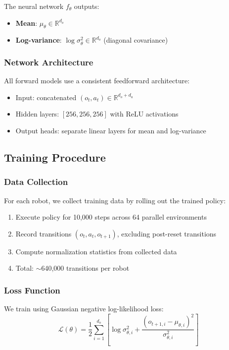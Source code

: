 \documentclass[11pt,a4paper]{article}
\begin{document}
The neural network $f_\theta$ outputs:
\begin{itemize}
    \item \textbf{Mean}: $\mu_\theta \in \mathbb{R}^{d_o}$
    \item \textbf{Log-variance}: $\log \sigma^2_\theta \in \mathbb{R}^{d_o}$ (diagonal covariance)
\end{itemize}

\subsubsection{Network Architecture}

All forward models use a consistent feedforward architecture:
\begin{itemize}
    \item Input: concatenated $(o_t, a_t) \in \mathbb{R}^{d_o + d_a}$
    \item Hidden layers: $[256, 256, 256]$ with ReLU activations
    \item Output heads: separate linear layers for mean and log-variance
\end{itemize}

\subsection{Training Procedure}

\subsubsection{Data Collection}

For each robot, we collect training data by rolling out the trained policy:
\begin{enumerate}
    \item Execute policy for 10,000 steps across 64 parallel environments
    \item Record transitions $(o_t, a_t, o_{t+1})$, excluding post-reset transitions
    \item Compute normalization statistics from collected data
    \item Total: $\sim$640,000 transitions per robot
\end{enumerate}

\subsubsection{Loss Function}

We train using Gaussian negative log-likelihood loss:
\begin{equation}
    \mathcal{L}(\theta) = \frac{1}{2} \sum_{i=1}^{d_o} \left[ \log \sigma_{\theta,i}^2 + \frac{(o_{t+1,i} - \mu_{\theta,i})^2}{\sigma_{\theta,i}^2} \right]
\end{equation}
\end{document}
